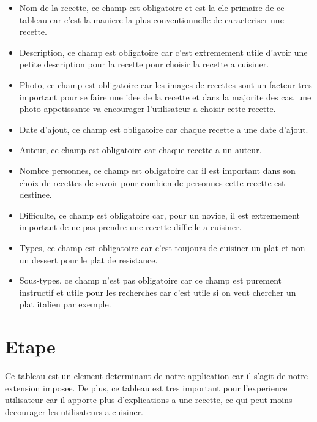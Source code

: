 \documentclass[a4paper,10pt]{report}
\begin{document}
\begin{itemize}
	\item Nom de la recette, ce champ est obligatoire et est la cle primaire de ce tableau car c'est la maniere la plus conventionnelle de caracteriser une recette. 
	\item Description, ce champ est obligatoire car c'est extremement utile d'avoir une petite description pour la recette pour choisir la recette a cuisiner.
	\item Photo, ce champ est obligatoire car les images de recettes sont un facteur tres important pour se faire une idee de la recette et dans la majorite des cas, une photo appetissante  va encourager l'utilisateur a choisir cette recette.
	\item Date d'ajout, ce champ est obligatoire car chaque recette a une date d'ajout.
	\item Auteur, ce champ est obligatoire car chaque recette a un auteur.
	\item Nombre personnes, ce champ est obligatoire car il est important dans son choix de recettes de savoir pour combien de personnes cette recette est destinee.
	\item Difficulte, ce champ est obligatoire car, pour un novice, il est extremement important de ne pas prendre une recette difficile a cuisiner.
	\item Types, ce champ est obligatoire car c'est toujours de cuisiner un plat et non un dessert pour le plat de resistance.
	\item Sous-types, ce champ n'est pas obligatoire car ce champ est purement instructif et utile pour les recherches car c'est utile si on veut chercher un plat italien par exemple.
\end{itemize}

\section{Etape}

Ce tableau est un element determinant de notre application car il s'agit de notre extension imposee. De plus, ce tableau est tres important pour l'experience utilisateur car il apporte plus d'explications a une recette, ce qui peut moins decourager les utilisateurs a cuisiner.
\end{document}
